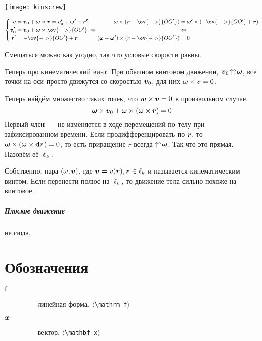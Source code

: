 \documentclass[ebook]{longnotes}
\begin{document}
\begin{minipage}{0.28\linewidth}
\vspace{1em}
\texttt{[image: kinscrew]}
\vspace{1em}
\end{minipage} \hfill
\begin{minipage}{0.68\linewidth}
$\displaystyle
\left\{
\begin{aligned}
  \v v &= \v{v_0} + \v \omega \times \v{r} = \v{v_0'} + \v{\omega'} \times \v{r'}\\
  \v {v_0'} &= \v{v_0} + \v \omega \times \ov{->} {OO'} \\
  \v r' &= -\ov{->} {OO'} + \v r \\
\end{aligned}\right. \Rightarrow 
\begin{aligned}
  \v\omega \times (\v r - \ov{->} {OO'} ) &= \v{\omega '} \times ( - \ov{->} {OO'} + \v r) \\
                                          &\Leftrightarrow \\
  (\v \omega - \v {\omega'} ) \times ( r- \ov{->}{OO'} ) &= 0
\end{aligned}
$
\end{minipage}
Смещаться можно как угодно, так что угловые скорости равны.

Теперь про кинематический винт. При обычном винтовом движении, $\v v_0 \coori \v\omega $,
все точки на оси просто движутся со скоростью $\v v_0$, для них $\v \omega \times \v v =0$.

Теперь найдём множество таких точек, что $\v w \times \v v = 0$ в произвольном случае.
\[
  \v \omega \times \v v_0 + \v \omega \times (\v \omega \times \v r) = 0
\]
Первый член~--- не изменяется в ходе перемещений по телу при зафиксированном времени.
Если продифференцировать по $\v r$, то $\v \omega \times (\v \omega \times \v {\del r}) = 0$, 
то есть приращение $r$ всегда $\coori \v \omega $. Так что это прямая. Назовём её $\ell_k$.

Собственно, пара $(\omega, \v v)$, где $\v v\v =v(\v r), \v r \in \ell_k$ и называется кинематическим
винтом. Если перенести полюс на $\ell_k$, то движение тела сильно похоже на винтовое.

\paragraph{Плоское движение}
не сюда.

\appendix
\chapter{Обозначения}
\begin{description}
  \item[$\v*{f}$]~--- линейная форма. \hfill$\langle$\verb+\mathrm f+$\rangle$
  \item[$\v{x}$]~--- вектор. \hfill$\langle$\verb+\mathbf x+$\rangle$
\end{description}
\end{document}
